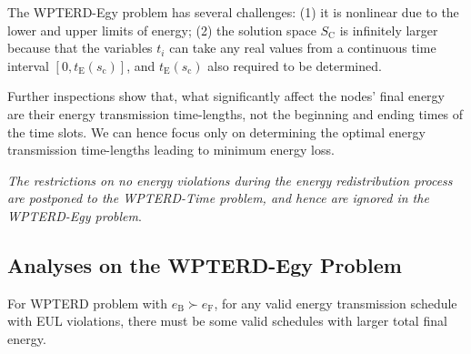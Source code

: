 \documentclass[journal,10pt]{IEEEtran}
\begin{document}
The WPTERD-Egy problem has several challenges: (1) it is nonlinear due to the lower and upper limits of energy; (2) the solution space $S_\text{C}$ is infinitely larger because that the variables $t_i$ can take any real values from a continuous time interval $[0, t_\text{E}(s_\text{c})]$, and $t_\text{E}(s_\text{c})$ also required to be determined.

Further inspections show that, what significantly affect the nodes' final energy are their energy transmission time-lengths, not the beginning and ending times of the time slots. We can hence focus only on determining the optimal energy transmission time-lengths leading to minimum energy loss.

\textit{The restrictions on no energy violations during the energy redistribution process are postponed to the WPTERD-Time problem, and hence are ignored in the WPTERD-Egy problem}.

\subsection{Analyses on the WPTERD-Egy Problem}

\begin{lemma}
\label{lemma_violation}
For WPTERD problem with $e_\text{B}{\succ}e_\text{F}$, for any valid energy transmission schedule with EUL violations, there must be some valid schedules with larger total final energy.
\end{lemma}
\end{document}
